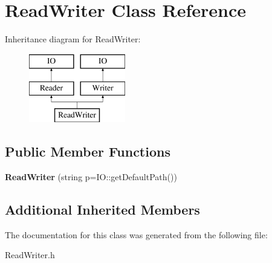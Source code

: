 \hypertarget{class_read_writer}{}\section{Read\+Writer Class Reference}
\label{class_read_writer}
Inheritance diagram for Read\+Writer\+:\begin{figure}[H]
\begin{center}
\leavevmode
\includegraphics[height=3.000000cm]{class_read_writer}
\end{center}
\end{figure}
\subsection*{Public Member Functions}
\begin{DoxyCompactItemize}
\item 
\mbox{\label{class_read_writer_a0321fa44af6d2da78daa62bb9ab4f7f9}} 
{\bfseries Read\+Writer} (string p=I\+O\+::get\+Default\+Path())
\end{DoxyCompactItemize}
\subsection*{Additional Inherited Members}


The documentation for this class was generated from the following file\+:\begin{DoxyCompactItemize}
\item 
Read\+Writer.\+h\end{DoxyCompactItemize}

